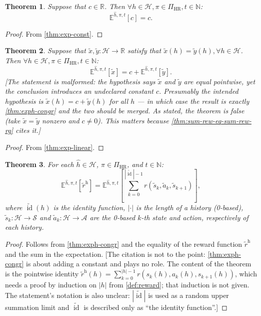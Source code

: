 \documentclass[letterpaper]{article}
\theoremstyle{plain}
\newtheorem{theorem}{Theorem}[subsection]
\theoremstyle{definition}
\theoremstyle{remark}
\newcommand{\Nats}{\mathbb{N}}
\newcommand{\Real}{\mathbb{R}}
\newcommand{\E}{\mathbb{E}}
\newcommand{\PiHR}{\Pi_{\mathrm{HR}}}
\newcommand{\rew}{\tilde{r}^{\mathrm{h}}}
\newcommand{\cc}[1]{\textcolor{ccolor}{[#1]}}
\newcommand{\id}{\operatorname{id}}
\newcommand{\lean}[1]{\textcolor{blue}{(\emph{LEAN}: \texttt{#1})}}
\newcommand{\leanok}{}
\begin{document}
\begin{theorem} \label{thm:exph-const}
Suppose that $c\in \Real$. Then $\forall h\in \mathcal{H}, \pi\in \PiHR, t \in \Nats$:
\[
  \E^{\hat{h}, \pi, t} \left[ c \right] = c.
\]
\end{theorem}
\begin{proof}
  From \cref{thm:exp-const}.
\end{proof}

\begin{theorem} \label{thm:exph-add-const}
Suppose that $\tilde{x}, \tilde{y} \colon \mathcal{H} \to \Real $ satisfy that $\tilde{x}(h) = \tilde{y}(h), \forall h \in \mathcal{H}$. Then $\forall h\in \mathcal{H}, \pi\in \PiHR, t \in \Nats$:
\[
  \E^{\hat{h}, \pi, t} \left[ \tilde{x} \right]
  =
  c + \E^{\hat{h}, \pi, t} \left[ \tilde{y} \right].
\]
\cc{The statement is malformed: the hypothesis says $\tilde{x}$ and $\tilde{y}$ are \emph{equal} pointwise, yet the conclusion introduces an undeclared constant $c$. Presumably the intended hypothesis is $\tilde{x}(h) = c + \tilde{y}(h)$ for all $h$ --- in which case the result is exactly \cref{thm:exph-congr} and the two should be merged. As stated, the theorem is false (take $\tilde x = \tilde y$ nonzero and $c\ne 0$). This matters because \cref{thm:sum-rew-eq-sum-rew-rg} cites it.}
\end{theorem}
\begin{proof}
From \cref{thm:exp-linear}.
\end{proof}

\begin{theorem}\label{thm:expret-eq-sum-rew}
For each $\hat{h}\in \mathcal{H}$, $\pi \in \PiHR$, and $t\in \Nats$:
\[
\E^{\hat{h}, \pi, t} \left[ \rew \right]
=
\E^{\hat{h}, \pi, t} \left[ \sum_{k=0}^{|\tilde{\id}|-1}  r(\tilde{s}_k, \tilde{a}_k, \tilde{s}_{k+1}) \right],
\]
where $\tilde{\id}(h)$ is the identity function, $|\cdot|$ is the length of a history (0-based), $\tilde{s}_k\colon \mathcal{H} \to \mathcal{S}$ and $\tilde{a}_k\colon \mathcal{H} \to \mathcal{A}$ are the 0-based $k$-th state and action, respectively of each history.
\end{theorem}
\begin{proof}
Follows from \cref{thm:exph-congr} and the equality of the reward function $\tilde{r}^{\mathrm{h}}$ and the sum in the expectation.
\cc{The citation is not to the point: \cref{thm:exph-congr} is about adding a constant and plays no role. The content of the theorem is the pointwise identity $\rew(h) = \sum_{k=0}^{|h|-1} r(s_k(h),a_k(h),s_{k+1}(h))$, which needs a proof by induction on $|h|$ from \cref{def:reward}; that induction is not given. The statement's notation is also unclear: $|\tilde{\id}|$ is used as a random upper summation limit and $\tilde{\id}$ is described only as ``the identity function''.}
\end{proof}
\end{document}
